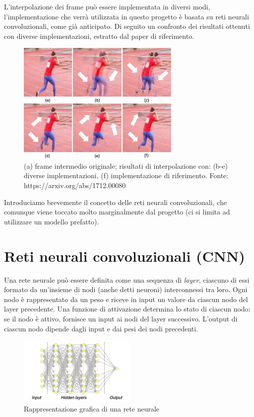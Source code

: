 L'interpolazione dei frame può essere implementata in diversi modi, l'implementazione che verrà utilizzata in questo progetto
è basata su reti neurali convoluzionali, come già anticipato. Di seguito un confronto dei risultati ottenuti con diverse
implementazioni, estratto dal paper di riferimento.

\newpage

\begin{figure}[t!]
    \includegraphics[width=0.7\textwidth]{img/confronto_interpolazione_frame.jpg}
    \centering
    \caption{(a) frame intermedio originale; risultati di interpolazione con: (b-e) diverse implementazioni, (f) implementazione
    di riferimento. Fonte: https://arxiv.org/abs/1712.00080}
    \label{fig:confronto_interpolazione_frame}
\end{figure}

Introduciamo brevemente il concetto delle reti neurali convoluzionali, che comunque viene toccato molto marginalmente dal
progetto (ci si limita ad utilizzare un modello prefatto).

\section*{Reti neurali convoluzionali (CNN)}

Una rete neurale può essere definita come una sequenza di \textit{layer}, ciascuno di essi formato da un'insieme di nodi (anche
detti neuroni) interconnessi tra loro. Ogni nodo è rappresentato da un peso e riceve in input un valore da ciascun nodo del layer 
precedente. Una funzione di attivazione determina lo stato di ciascun nodo: se il nodo è attivo, fornisce un input ai nodi del
layer successivo. L'output di ciascun nodo dipende dagli input e dai pesi dei nodi precedenti.

\begin{figure}[h!]
    \includegraphics[width=0.5\textwidth]{img/rete_neurale.jpg}
    \centering
    \caption{Rappresentazione grafica di una rete neurale}
    \label{fig:rete_neurale}
\end{figure}

